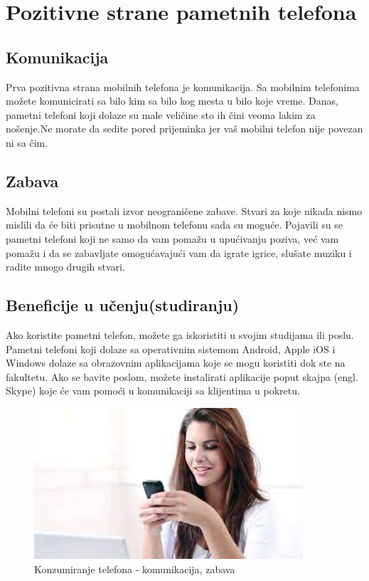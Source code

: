 \documentclass[a4paper]{article}
\begin{document}
\newpage
\section{Pozitivne strane pametnih telefona}

\subsection{Komunikacija}
Prva pozitivna strana mobilnih telefona je komunikacija. Sa mobilnim telefonima
možete komunicirati sa bilo kim sa bilo kog mesta u bilo koje vreme.
Danas, pametni telefoni koji dolaze su male veličine sto ih čini veoma lakim za
nošenje.Ne morate da sedite pored prijeminka jer vaš mobilni telefon nije
povezan ni sa čim.

\subsection{Zabava}
Mobilni telefoni su postali izvor neograničene zabave.
Stvari za koje nikada nismo mislili da će biti prisutne u mobilnom telefonu
sada su moguće. Pojavili su se pametni telefoni koji ne samo da vam pomažu
u upućivanju poziva, već vam pomažu i da se zabavljate omogućavajući
vam da igrate igrice, slušate muziku i radite mnogo drugih stvari.

\subsection{Beneficije u učenju(studiranju)}
Ako koristite pametni telefon, možete ga iskoristiti u svojim studijama ili poslu.
Pametni telefoni koji dolaze sa operativnim sistemom Android, Apple iOS i Windows
dolaze sa obrazovnim aplikacijama koje se mogu koristiti dok ste na fakultetu.
Ako se bavite poslom, možete instalirati aplikacije
poput skajpa (engl. Skype) koje će vam pomoći u komunikaciji sa klijentima u
pokretu.


\begin{figure}[h!]
\centering
\begin{center}
\includegraphics[width=100mm]{image1.jpeg}
\end{center}
\caption{Konzumiranje telefona - komunikacija, zabava}
\label{fig:vr}
\end{figure}
\end{document}
